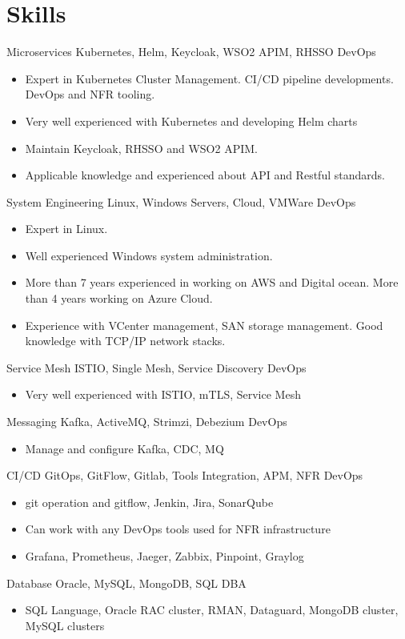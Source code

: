 \documentclass[]{friggeri-cv}
\begin{document}
\section{Skills}
\begin{entrylist}
  \entry
  {Microservices}
  {Kubernetes, Helm, Keycloak, WSO2 APIM, RHSSO}
  {DevOps}
  {  \begin{itemize}
      \item Expert in Kubernetes Cluster Management. CI/CD pipeline developments. DevOps and NFR tooling.
      \item Very well experienced with Kubernetes and developing Helm charts
      \item Maintain Keycloak, RHSSO and WSO2 APIM.
      \item Applicable knowledge and experienced about API and Restful standards.
    \end{itemize}}
    \entry
    {System Engineering}
    {Linux, Windows Servers, Cloud, VMWare}
    {DevOps}
    {  \begin{itemize}
        \item Expert in Linux.
        \item Well experienced Windows system administration.
        \item More than 7 years experienced in working on AWS and Digital ocean. More than 4 years working on Azure Cloud.
        \item Experience with VCenter management, SAN storage management. Good knowledge with TCP/IP network stacks.
      \end{itemize}}
  \entry
  {Service Mesh}
  {ISTIO, Single Mesh, Service Discovery}
  {DevOps}
  {  \begin{itemize}
      \item Very well experienced with ISTIO, mTLS, Service Mesh
    \end{itemize}}
  \entry
  {Messaging}
  {Kafka, ActiveMQ, Strimzi, Debezium}
  {DevOps}
  { \begin{itemize}
      \item Manage and configure Kafka, CDC, MQ
    \end{itemize}}
  \entry
  {CI/CD}
  {GitOps, GitFlow, Gitlab, Tools Integration, APM, NFR}
  {DevOps}
  { \begin{itemize}
      \item git operation and gitflow, Jenkin, Jira, SonarQube
      \item Can work with any DevOps tools used for NFR infrastructure
      \item Grafana, Prometheus, Jaeger, Zabbix, Pinpoint, Graylog
    \end{itemize}}
  \entry
  {Database}
  {Oracle, MySQL, MongoDB, SQL}
  {DBA}
  { \begin{itemize}
      \item SQL Language, Oracle RAC cluster, RMAN, Dataguard, MongoDB cluster, MySQL clusters
    \end{itemize}}
  
\end{entrylist}
\end{document}
